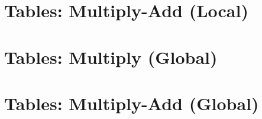 \documentclass[12pt]{article}
\begin{document}
\section*{Tables: Multiply-Add (Local)}















\section*{Tables: Multiply (Global)}











\section*{Tables: Multiply-Add (Global)}










\end{document}
